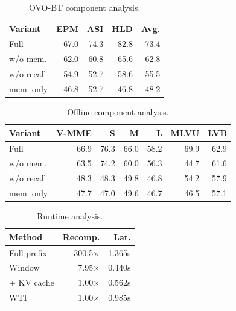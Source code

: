 \begin{table}[t]
  \centering
  \scriptsize
  \setlength{\tabcolsep}{5pt}
  \renewcommand{\arraystretch}{1.08}
  \begin{tabular}{@{}lrrrr@{}}
    \hline
    Variant & EPM & ASI & HLD & Avg. \\
    \hline
    \rowcolor{softblue}
    Full & 67.0 & 74.3 & 82.8 & 73.4 \\
    w/o mem. & 62.0 & 60.8 & 65.6 & 62.8 \\
    w/o recall & 54.9 & 52.7 & 58.6 & 55.5 \\
    mem. only & 46.8 & 52.7 & 46.8 & 48.2 \\
    \hline
  \end{tabular}
  \caption{OVO-BT component analysis.}
  \label{tab:appendix_ovobt_component}
\end{table}

\begin{table}[t]
  \centering
  \scriptsize
  \setlength{\tabcolsep}{4pt}
  \renewcommand{\arraystretch}{1.08}
  \begin{tabular}{@{}lrrrrrr@{}}
    \hline
    Variant & V-MME & S & M & L & MLVU & LVB \\
    \hline
    \rowcolor{softblue}
    Full & 66.9 & 76.3 & 66.0 & 58.2 & 69.9 & 62.9 \\
    w/o mem. & 63.5 & 74.2 & 60.0 & 56.3 & 44.7 & 61.6 \\
    w/o recall & 48.3 & 48.3 & 49.8 & 46.8 & 54.2 & 57.9 \\
    mem. only & 47.7 & 47.0 & 49.6 & 46.7 & 46.5 & 57.1 \\
    \hline
  \end{tabular}
  \caption{Offline component analysis.}
  \label{tab:appendix_offline_component}
\end{table}

\begin{table}[t]
  \centering
  \scriptsize
  \setlength{\tabcolsep}{7pt}
  \renewcommand{\arraystretch}{1.08}
  \begin{tabular}{@{}lrr@{}}
    \hline
    Method & Recomp. & Lat. \\
    \hline
    Full prefix & 300.5$\times$ & 1.365s \\
    Window & 7.95$\times$ & 0.440s \\
    + KV cache & 1.00$\times$ & 0.562s \\
    \rowcolor{softblue}
    WTI & 1.00$\times$ & 0.985s \\
    \hline
  \end{tabular}
  \caption{Runtime analysis.}
  \label{tab:appendix_runtime}
\end{table}

